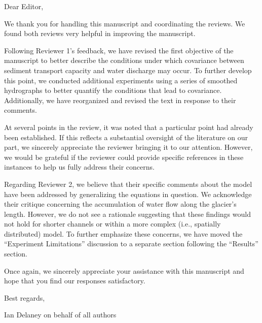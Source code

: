 \documentclass[11pt]{article}
\title{}
\author{}
\begin{document}
Dear Editor,

We thank you for handling this manuscript and coordinating the reviews. We found both reviews very helpful in improving the manuscript.

\vspace{.2cm}

Following Reviewer 1’s feedback, we have revised the first objective of the manuscript to better describe the conditions under which covariance between sediment transport capacity and water discharge may occur. To further develop this point, we conducted additional experiments using a series of smoothed hydrographs to better quantify the conditions that lead to covariance. Additionally, we have reorganized and revised the text in response to their comments. 

At several points in the review, it was noted that a particular point had already been established. If this reflects a substantial oversight of the literature on our part, we sincerely appreciate the reviewer bringing it to our attention. However, we would be grateful if the reviewer could provide specific references in these instances to help us fully address their concerns.

\vspace{.2cm}

Regarding Reviewer 2, we believe that their specific comments about the model have been addressed by generalizing the equations in question. We acknowledge their critique concerning the accumulation of water flow along the glacier’s length. However, we do not see a rationale suggesting that these findings would not hold for shorter channels or within a more complex (i.e., spatially distributed) model. To further emphasize these concerns, we have moved the ``Experiment Limitations'' discussion to a separate section following the ``Results'' section.

\vspace{.2cm}

Once again, we sincerely appreciate your assistance with this manuscript and hope that you find our responses satisfactory.

\vspace{.5cm}

Best regards,

\vspace{.75cm}

Ian Delaney on behalf of all authors

 

\end{document}
